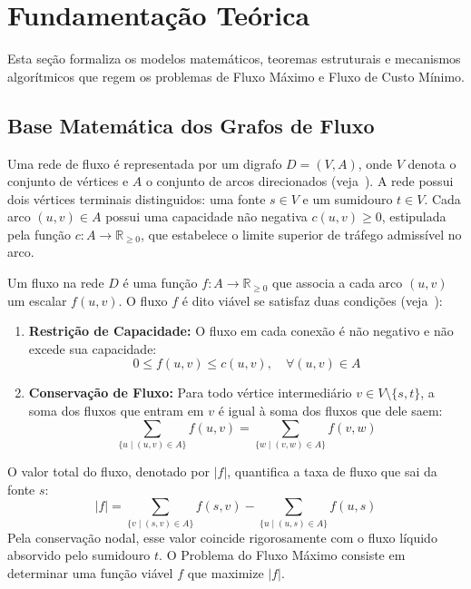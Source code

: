 \section{Fundamentação Teórica}\label{sec:fundamentacao}

Esta seção formaliza os modelos matemáticos, teoremas estruturais e mecanismos algorítmicos que regem os problemas de Fluxo Máximo e Fluxo de Custo Mínimo.

\subsection{Base Matemática dos Grafos de Fluxo}

Uma rede de fluxo é representada por um digrafo $D = (V, A)$, onde $V$ denota o conjunto de vértices e $A$ o conjunto de arcos direcionados (veja~\cite{ahuja1993network, bondy2008graph}). A rede possui dois vértices terminais distinguidos: uma fonte $s \in V$ e um sumidouro $t \in V$. Cada arco $(u, v) \in A$ possui uma capacidade não negativa $c(u, v) \ge 0$, estipulada pela função $c: A \to \mathbb{R}_{\ge 0}$, que estabelece o limite superior de tráfego admissível no arco.

Um fluxo na rede $D$ é uma função $f: A \to \mathbb{R}_{\ge 0}$ que associa a cada arco $(u, v)$ um escalar $f(u, v)$. O fluxo $f$ é dito viável se satisfaz duas condições  (veja~\cite{ford1956maximal, cook1998combinatorial}):
\begin{enumerate}
    \item \textbf{Restrição de Capacidade:} O fluxo em cada conexão é não negativo e não excede sua capacidade:
    \begin{equation}
        0 \le f(u, v) \le c(u, v), \quad \forall (u, v) \in A
    \end{equation}
    \item \textbf{Conservação de Fluxo:} Para todo vértice intermediário $v \in V \setminus \{s, t\}$, a soma dos fluxos que entram em $v$ é igual à soma dos fluxos que dele saem:
    \begin{equation}
        \sum_{\{u \mid (u, v) \in A\}} f(u, v) = \sum_{\{w \mid (v, w) \in A\}} f(v, w)
    \end{equation}
\end{enumerate}

O valor total do fluxo, denotado por $|f|$, quantifica a taxa de fluxo que sai da fonte $s$:
\begin{equation}
    |f| = \sum_{\{v \mid (s, v) \in A\}} f(s, v) - \sum_{\{u \mid (u, s) \in A\}} f(u, s)
\end{equation}
Pela conservação nodal, esse valor coincide rigorosamente com o fluxo líquido absorvido pelo sumidouro $t$. O Problema do Fluxo Máximo consiste em determinar uma função viável $f$ que maximize $|f|$.

